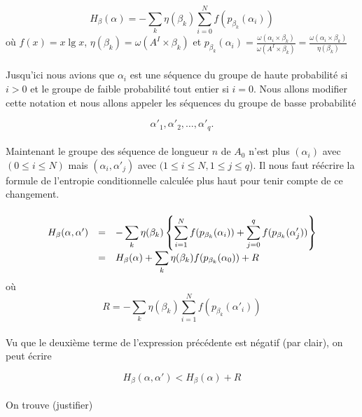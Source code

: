 	\[H_\beta(\alpha) = - \sum_k\eta(\beta_k)\sum_{i=0}^Nf(p_{\beta_k}(\alpha_i))\]
	où $f(x) = x \lg x$, $\eta(\beta_k) = \omega(A^I \times \beta_k)$ 
	et $p_{\beta_k}(\alpha_i) = \frac{\omega(\alpha_i \times \beta_k)}{\omega(A^I \times \beta_k)}=\frac{\omega(\alpha_i \times \beta_k)}{\eta(\beta_k)}$	
	
	\paragraph{}
	Jusqu'ici nous avions que $\alpha_i$ est une séquence du groupe de haute probabilité si $i>0$ et le groupe de faible probabilité tout entier si $i=0$.
	Nous allons modifier cette notation et nous allons appeler les séquences du groupe de basse probabilité 
	
	\[\alpha'_1, \alpha'_2, \dots, \alpha'_q.\]
	
	\paragraph{}
	Maintenant le groupe des séquence de longueur $n$ de $A_0$ n'est plus $(\alpha_i)$ avec $(0 \le i \le N)$ mais $(\alpha_i, \alpha'_j)$ avec $(1\le i \le N, 1 \le j \le q$).
	Il nous faut réécrire la formule de l'entropie conditionnelle calculée plus haut pour tenir compte de ce changement.
	
	\paragraph{}
	\[
		\begin{array}{r c >{\displaystyle}l}
			H_\beta(\alpha,\alpha') &=& - \sum_k\eta(\beta_k)\left\{\sum_{i=1}^Nf(p_{\beta_k}(\alpha_i))+\sum_{j=0}^qf(p_{\beta_k}(\alpha'_j))\right\}\\
			&=& H_\beta(\alpha) + \sum_k\eta(\beta_k)f(p_{\beta_k}(\alpha_0))+R
		\end{array}
	\]
	où
	\[R=- \sum_k\eta(\beta_k)\sum_{i=1}^Nf(p_{\beta_k}(\alpha'_i))\]
	
	\paragraph{}
	Vu que le deuxième terme de l'expression précédente est négatif (par clair), on peut écrire
	
	\[H_\beta(\alpha,\alpha') < H_\beta(\alpha) + R\]
	
	\paragraph{}
	On trouve (justifier)
	
